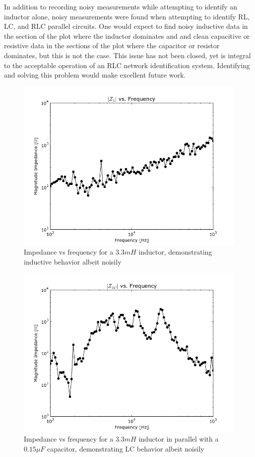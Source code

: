 \documentclass[11pt,twoside]{mitthesis}
\begin{document}
In addition to recording noisy measurements while attempting to identify an inductor alone, noisy measurements were found when attempting to identify RL, LC, and RLC parallel circuits.
One would expect to find noisy inductive data in the section of the plot where the inductor dominates and and clean capacitive or resistive data in the sections of the plot where the capacitor or resistor dominates, but this is not the case.
This issue has not been closed, yet is integral to the acceptable operation of an RLC network identification system.
Identifying and solving this problem would make excellent future work.

\begin{figure}[h]
	\label{fig:lplot}
  \begin{center}
      \includegraphics[width=.7\textwidth]{../zl.png}
      \caption{Impedance vs frequency for a $3.3mH$ inductor, demonstrating inductive behavior albeit noisily}
  \end{center}
\end{figure}

\begin{figure}[H]
	\label{fig:lcplot}
  \begin{center}
      \includegraphics[width=.7\textwidth]{../zlc.png}
      \caption{Impedance vs frequency for a $3.3mH$ inductor in parallel with a $0.15\mu F$ capacitor, demonstrating LC behavior albeit noisily}
  \end{center}
\end{figure}
\newpage
\end{document}
